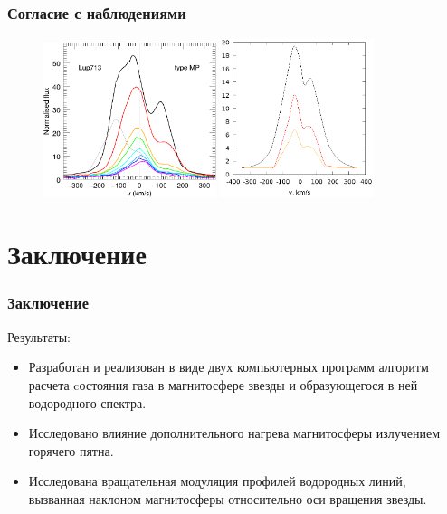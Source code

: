 \documentclass{beamer}
\begin{document}
\begin{frame}
\frametitle{Согласие с наблюдениями}
\begin{figure}[h]
\centering
\includegraphics[width=0.45\textwidth]{profiles2.png}
\includegraphics[width=0.4\textwidth]{lookslike45.eps}
\end{figure} 
\end{frame}


\section{Заключение}

\begin{frame}
\frametitle{Заключение}
Результаты:
\begin{itemize}
\item Разработан и реализован в виде двух компьютерных программ алгоритм расчета cостояния газа в магнитосфере звезды и образующегося в ней водородного спектра.
\item Исследовано влияние дополнительного нагрева магнитосферы излучением горячего пятна.
\item Исследована вращательная модуляция профилей водородных линий, вызванная наклоном магнитосферы относительно оси вращения звезды.
\end{itemize}
\end{frame}
\end{document}
